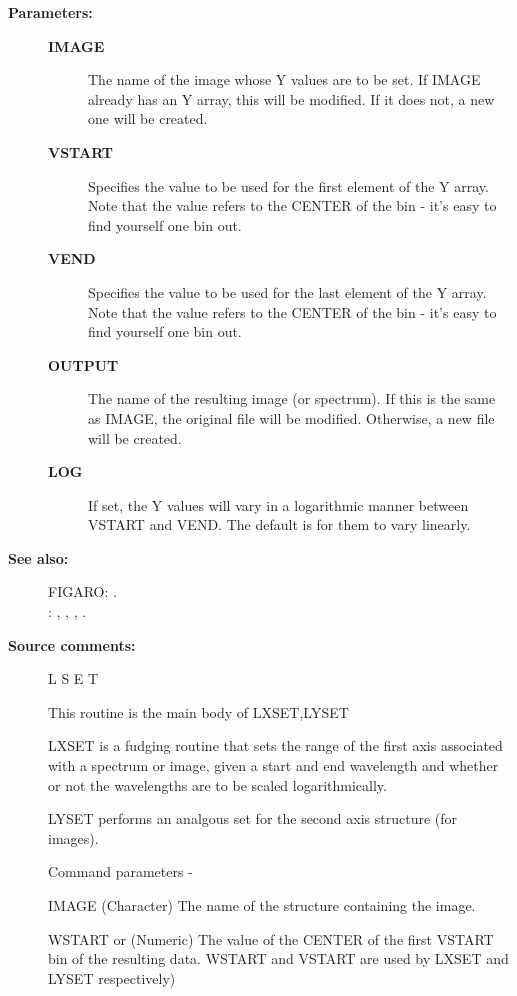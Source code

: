 \begin{description}
\begin{description}
\item [\textbf{Parameters:}]
\begin{description}
\item [\textbf{IMAGE}]
 The name of the image whose Y values are to be set.
 If IMAGE already has an Y array, this will be modified.
 If it does not, a new one will be created.
\item [\textbf{VSTART}]
 Specifies the value to be used for the first
 element of the Y array.
 Note that the value refers to the CENTER of the
 bin - it's easy to find yourself one bin out.
\item [\textbf{VEND}]
 Specifies the value to be used for the last
 element of the Y array.
 Note that the value refers to the CENTER of the
 bin - it's easy to find yourself one bin out.
\item [\textbf{OUTPUT}]
 The name of the resulting image (or spectrum).
 If this is the same as IMAGE, the original file
 will be modified.  Otherwise, a new file will be created.
\item [\textbf{LOG}]
 If set, the Y values will vary in a logarithmic
 manner between VSTART and VEND.  The default is
 for them to vary linearly.
\end{description}

\item [\textbf{See also:}]
FIGARO: .\\
: , , , .\\

\item [\textbf{Source comments:}]
\begin{terminalv}
 L S E T

 This routine is the main body of LXSET,LYSET

 LXSET is a fudging routine that sets the range of the first axis
 associated with a spectrum or image, given a start and end wavelength and
 whether or not the wavelengths are to be scaled logarithmically.

 LYSET performs an analgous set for the second axis structure
 (for images).

 Command parameters -

 IMAGE      (Character) The name of the structure containing the image.

 WSTART or  (Numeric) The value of the CENTER of the first
 VSTART      bin of the resulting data. WSTART and VSTART are used
             by  LXSET and LYSET respectively)


\end{terminalv}
\end{description}
\end{description}
